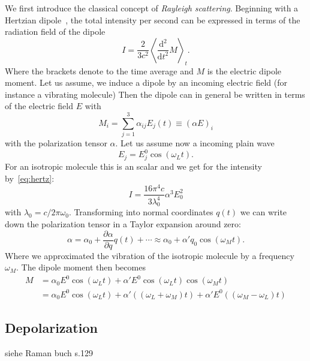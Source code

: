 We first introduce the classical concept of \textit{Rayleigh scattering}.
Beginning with a Hertzian dipole~\cite{koningstein1972introduction}, the total intensity
per second can be expressed in terms of the radiation field of the dipole 
\begin{equation}
    \label{eq:hertz}
   I = \frac{2}{3 c^2} \left \langle \frac{\mathrm{d}^2}{\mathrm{d} t^2}  M \right \rangle_t.
\end{equation}
Where the brackets denote to the time average and $M$ is the electric dipole moment. Let us assume,
we induce a dipole by an incoming electric field (for instance a vibrating molecule)
Then the dipole can in general be written in terms of the electric field $E$ with
\begin{equation}
    M_i = \sum^{3}_{j=1} \alpha_{ij} E_j(t) \equiv {(\alpha E )}_i
\end{equation}
with the polarization tensor $\alpha$.
Let us assume now a incoming plain wave 
\begin{equation}
    E_j = E^0_j \cos(\omega_L t).
\end{equation}
For an isotropic molecule this is an scalar and we get
for the intensity by~\eqref{eq:hertz}:
\begin{equation}
    I = \frac{16 \pi^4 c}{3 \lambda_0^4} \alpha ^3 E_0 ^2
\end{equation}
with $\lambda_0 = c/ 2\pi \omega_0$. Transforming into normal coordinates $q(t)$ we can write down the polarization tensor
in a Taylor expansion around zero\cite{ver}:
\begin{equation}
    \alpha = \alpha_0 + \frac{\partial\alpha}{\partial q}q(t) + \cdots \approx \alpha_0 + \alpha' q_0 \cos(\omega_M t).
\end{equation}
Where we approximated the vibration of the isotropic molecule by a frequency $\omega_M$.
The dipole moment then becomes
\begin{align}
    M &= \alpha_0 E^0 \cos(\omega_L t) + \alpha' E^0 \cos(\omega_L t) \cos(\omega_M t) \\
      &= \alpha_0 E^0 \cos(\omega_L t) + \alpha ' ((\omega_L + \omega_M)t ) + \alpha ' E^0 ((\omega_M - \omega_L)t) 
\end{align}



\subsection{Depolarization}

siehe Raman buch s.129
